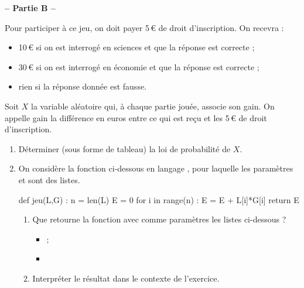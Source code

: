 \documentclass[a4paper,11pt]{article}
\begin{document}
\textbf{-- Partie B --}

\medskip

Pour participer à ce jeu, on doit payer 5\,€ de droit d'inscription. On recevra :

\begin{itemize}
	\item 10\,€ si on est interrogé en sciences et que la réponse est correcte ;
	\item 30\,€ si on est interrogé en économie et que la réponse est correcte ;
	\item rien si la réponse donnée est fausse.
\end{itemize}

Soit $X$ la variable aléatoire qui, à chaque partie jouée, associe son gain. On appelle gain la différence en euros entre ce qui est reçu et les 5\,€ de droit d'inscription.

\begin{enumerate}
	\item Déterminer (sous forme de tableau) la loi de probabilité de $X$.
	\item On considère la fonction  ci-dessous en langage \calgpython, pour laquelle les paramètres  et  sont des listes.
		
	\begin{envpython}[13cm]
		def jeu(L,G) :
			n = len(L)
			E = 0
			for i in range(n) :
				E = E + L[i]*G[i]
			return E
	\end{envpython}
	\begin{enumerate}
		\item Que retourne la fonction  avec comme paramètres les listes ci-dessous ?
		\begin{itemize}
			\item {} ;
			\item {}
		\end{itemize}
		\item Interpréter le résultat dans le contexte de l'exercice.
	\end{enumerate}
\end{enumerate}
\end{document}
